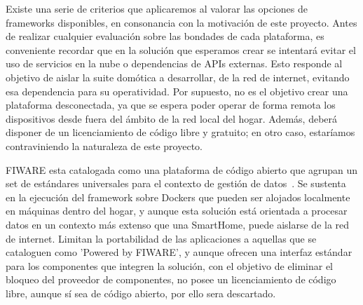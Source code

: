 Existe una serie de criterios que aplicaremos al valorar las opciones de frameworks disponibles, en consonancia con la motivación de este proyecto. Antes de realizar cualquier evaluación sobre las bondades de cada plataforma, es conveniente recordar que en la solución que esperamos crear se intentará evitar el uso de servicios en la nube o dependencias de APIs externas. Esto responde al objetivo de aislar la suite domótica a desarrollar, de la red de internet, evitando esa dependencia para su operatividad. Por supuesto, no es el objetivo crear una plataforma desconectada, ya que se espera poder operar de forma remota los dispositivos desde fuera del ámbito de la red local del hogar. Además, deberá disponer de un licenciamiento de código libre y gratuito; en otro caso, estaríamos contraviniendo la naturaleza de este proyecto.

\vspace{1cm}

FIWARE esta catalogada como una plataforma de código abierto que agrupan un set de estándares universales para el contexto de gestión de datos~\cite{whatisfiware}. Se sustenta en la ejecución del framework sobre Dockers que pueden ser alojados localmente en máquinas dentro del hogar, y aunque esta solución está orientada a procesar datos en un contexto más extenso que una SmartHome, puede aislarse de la red de internet. Limitan la portabilidad de las aplicaciones a aquellas que se cataloguen como 'Powered by FIWARE', y aunque ofrecen una interfaz estándar para los componentes que integren la solución, con el objetivo de eliminar el bloqueo del proveedor de componentes, no posee un licenciamiento de código libre, aunque sí sea de código abierto, por ello sera descartado.

\vspace{1cm}

